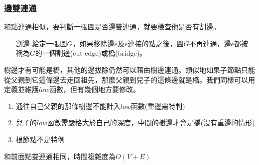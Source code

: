 \subsubsection{邊雙連通}
和點連通相似，要判斷一張圖是否邊雙連通，就要檢查他是否有割邊。
\begin{enumerate}
\item [割邊] 給定一張圖$G$，如果移除邊$e$及$e$連接的點之後，圖$G$不再連通，邊$e$都被稱為$G$的一個割邊(cut-edge)或橋(bridge)。
\end{enumerate}
樹邊才有可能是橋，其他的邊拔除仍然可以藉由樹邊連通。類似地如果子節點只能從父親到它這條邊去走回祖先，那麼父親到兒子的這條邊就是橋。我們同樣可以用定義並維護$low$函數，但有幾個地方要修改。
\begin{enumerate}
\item 通往自己父親的那條樹邊不能計入$low$函數(重邊需特判)
\item 兒子的$low$函數需嚴格大於自己的深度，中間的樹邊才會是橋(沒有重邊的情形)
\item 根節點不是特例
\end{enumerate}

和前面點雙連通相同，時間複雜度為$O(V+E)$